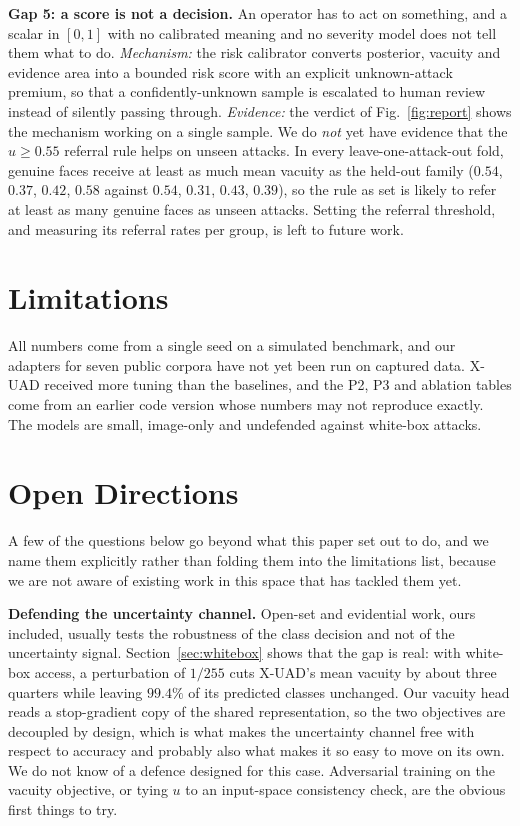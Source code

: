 \documentclass[conference]{IEEEtran}
\begin{document}
\textbf{Gap 5: a score is not a decision.} An operator has to act on something, and a
scalar in $[0,1]$ with no calibrated meaning and no severity model does not tell them
what to do. \emph{Mechanism:} the risk calibrator converts posterior, vacuity and
evidence area into a bounded risk score with an explicit unknown-attack premium, so
that a confidently-unknown sample is escalated to human review instead of silently
passing through. \emph{Evidence:} the verdict of Fig.~\ref{fig:report} shows the
mechanism working on a single sample. We do \emph{not} yet have evidence that the
$u\ge0.55$ referral rule helps on unseen attacks. In every leave-one-attack-out
fold, genuine faces receive at least as much mean vacuity as the held-out family
($0.54$, $0.37$, $0.42$, $0.58$ against $0.54$, $0.31$, $0.43$, $0.39$), so the rule
as set is likely to refer at least as many genuine faces as unseen attacks. Setting
the referral threshold, and measuring its referral rates per group, is left to
future work.

\section{Limitations}\label{sec:limits}

All numbers come from a single seed on a simulated benchmark, and our adapters for
seven public corpora have not yet been run on captured data. X-UAD received more
tuning than the baselines, and the P2, P3 and ablation tables come from an earlier
code version whose numbers may not reproduce exactly. The models are small,
image-only and undefended against white-box attacks.

\section{Open Directions}\label{sec:open}
A few of the questions below go beyond what this paper set out to do, and we name
them explicitly rather than folding them into the limitations list, because we are
not aware of existing work in this space that has tackled them yet.

\textbf{Defending the uncertainty channel.} Open-set and evidential work, ours
included, usually tests the robustness of the class decision and not of the
uncertainty signal. Section~\ref{sec:whitebox} shows that the gap is real: with
white-box access, a perturbation of $1/255$ cuts X-UAD's mean vacuity by about
three quarters while leaving $99.4\%$ of its predicted classes unchanged. Our vacuity head reads a
stop-gradient copy of the shared representation, so the two objectives are
decoupled by design, which is what makes the uncertainty channel free with respect
to accuracy and probably also what makes it so easy to move on its own. We do not
know of a defence designed for this case. Adversarial training on the vacuity
objective, or tying $u$ to an input-space consistency check, are the obvious first
things to try.
\end{document}
